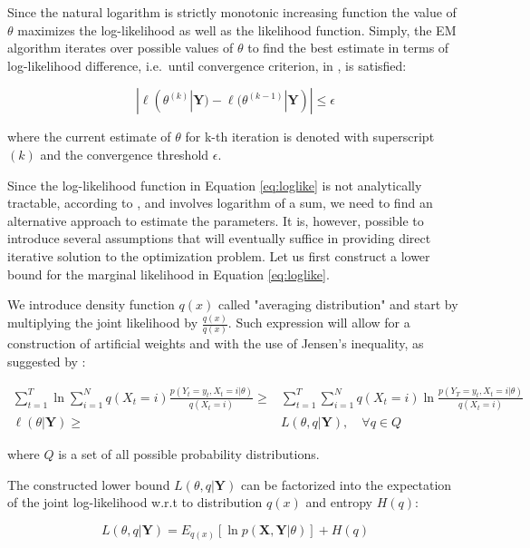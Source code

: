Since the natural logarithm is strictly monotonic increasing function the value of $\theta$ maximizes the log-likelihood as well as the 
likelihood function. Simply, the EM algorithm iterates over possible values of $\theta$ to find the best estimate in terms of log-likelihood difference, 
i.e.\ until convergence criterion, in \citep{McLachlan2008}, is satisfied:

\begin{equation} \label{eq:conv}
|\ell(\theta^{(k)}|\textbf{Y}) - \ell(\theta^{(k-1)}|\textbf{Y})| \leq \epsilon 
\end{equation}

where the current estimate of $\theta$ for k-th iteration is denoted with superscript $(k)$ 
and the convergence threshold $\epsilon$. 

Since the log-likelihood function in Equation \ref{eq:loglike} is not analytically tractable, according to \citep{Bishop2006}, and involves logarithm of a sum,
we need to find an alternative approach to estimate the parameters.
It is, however, possible to introduce several assumptions that will eventually suffice in providing 
direct iterative solution to the optimization problem. Let us first construct a lower bound for the 
marginal likelihood in Equation \ref{eq:loglike}.

We introduce density function $q(x)$ called "averaging distribution" and start by multiplying 
the joint likelihood by $\frac{q(x)}{q(x)}$. Such expression will allow for a construction of 
artificial weights and with the use of Jensen's inequality, as suggested by \citep{Gu2008}:

\begin{align}
    \sum_{t=1}^{T} \ln \sum_{i=1}^{N} q(X_t = i) \frac{p(Y_t=y_t, X_t = i|\theta)}{q(X_t = i)} \geq& \sum_{t=1}^{T} \sum_{i=1}^{N} q(X_t = i) \ln \frac{p(Y_T =y_t, X_t = i|\theta)}{q(X_t = i)} \\
    \ell(\theta|\textbf{Y}) \geq& L(\theta,q|\textbf{Y}), \quad \forall q \in Q
\end{align}

where $Q$ is a set of all possible probability distributions.

The constructed lower bound $L(\theta,q|\textbf{Y})$ can be factorized into the expectation 
of the joint log-likelihood w.r.t to distribution $q(x)$ and entropy $H(q)$:

\begin{equation}
    L(\theta,q|\textbf{Y}) = E_{q(x)} [\ln p(\textbf{X},\textbf{Y}|\theta)] + H(q)
\end{equation}

